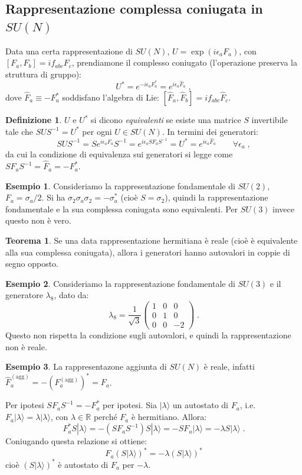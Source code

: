 \documentclass[12pt,a4paper]{article}
\theoremstyle{definition}
\newtheorem{thm}{Teorema}
\newtheorem{dfn}{Definizione}[section]
\newtheorem{exm}{Esempio}
\newcommand{\ket}{\rangle}
\numberwithin{equation}{section}
\begin{document}
\subsection{Rappresentazione complessa coniugata in $SU(N)$}
Data una certa rappresentazione di $SU(N)$, $U=\exp(i\epsilon_aF_a)$, con $[F_a,F_b]=if_{abc}F_c$, prendiamone il complesso coniugato (l'operazione preserva la struttura di gruppo):
$$
U^*=e^{-i\epsilon_aF_a^*}=e^{i\epsilon_a\hat{F}_a}\;,
$$
dove $\hat{F}_a\equiv -F_a^*$ soddisfano l'algebra di Lie: $[\hat{F}_a,\hat{F}_b]=if_{abc}\hat{F}_c$.
\begin{dfn}
$U$ e $U^*$ si dicono \emph{equivalenti} se esiste una matrice $S$ invertibile tale che $SUS^{-1}=U^*$ per ogni $U\in SU(N)$. In termini dei generatori:
$$
SUS^{-1}=Se^{i\epsilon_aF_a}S^{-1}=e^{i\epsilon_aSF_aS^{-1}}=U^*=e^{i\epsilon_a\hat{F}_a}\qquad \forall \epsilon_a\;,
$$
da cui la condizione di equivalenza sui generatori si legge come $SF_aS^{-1}=\hat{F}_a=-F_a^*$.
\end{dfn}
\begin{exm}
Consideriamo la rappresentazione fondamentale di $SU(2)$, $F_a=\sigma_a/2$. Si ha $\sigma_2\sigma_a\sigma_2=-\sigma_a^*$ (cioè $S=\sigma_2$), quindi la rappresentazione fondamentale e la sua complessa coniugata sono equivalenti. Per $SU(3)$ invece questo non è vero.
\end{exm}
\begin{thm} 
Se una data rappresentazione hermitiana è reale (cioè è equivalente alla sua complessa coniugata), allora i generatori hanno autovalori in coppie di segno opposto.

\end{thm}
\begin{exm} 
Consideriamo la rappresentazione fondamentale di $SU(3)$ e il generatore $\lambda_8$, dato da:
\begin{equation*}
\lambda_8=\frac{1}{\sqrt{3}}\left(\begin{matrix}
1 & 0 & 0 \\
0 & 1 & 0 \\
0 & 0 & -2
\end{matrix}\right)\;.
\end{equation*}
Questo non rispetta la condizione sugli autovalori, e quindi la rappresentazione non è reale.
\end{exm}
\begin{exm}
La rappresentazone aggiunta di $SU(N)$ è reale, infatti $\hat{F}_a^{(\mathrm{agg})}=-(F^{(\mathrm{agg})}_a)^*=F_a$.
\end{exm}
\proof 
Per ipotesi $SF_aS^{-1}=-F_a^*$ per ipotesi. Sia $|\lambda\ket$ un autostato di $F_a$, i.e. $F_a|\lambda\ket=\lambda|\lambda\ket$, con $\lambda\in\mathbb{R}$ perché $F_a$ è hermitiano. Allora:
$$
F_a^*S|\lambda\ket=-(SF_aS^{-1})S|\lambda\ket=-SF_a|\lambda\ket=-\lambda S|\lambda\ket\;.
$$
Coniugando questa relazione si ottiene:
$$
F_a(S|\lambda\ket)^*=-\lambda(S|\lambda\ket)^*
$$
cioè $(S|\lambda\ket)^*$ è autostato di $F_a$ per $-\lambda$.
\endproof
\end{document}
